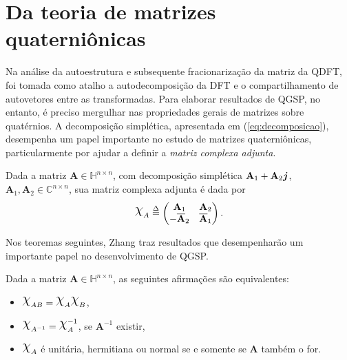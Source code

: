 
\section{Da teoria de matrizes quaterni\^onicas}

Na an\'alise da autoestrutura e subsequente fracionariza\c c\~ao da matriz da QDFT, foi tomada como atalho a autodecomposi\c c\~ao da DFT e o compartilhamento de autovetores entre as transformadas. Para elaborar resultados de QGSP, no entanto, \'e preciso mergulhar nas propriedades gerais de matrizes sobre quat\'ernios. A decomposi\c c\~ao simpl\'etica, apresentada em (\ref{eq:decomposicao}), desempenha um papel importante no estudo de matrizes quaterni\^onicas, particularmente por ajudar a definir a \emph{matriz complexa adjunta}.

\begin{definition}
Dada a matriz $ \mathbf{A} \in \mathbb{H}^{n \times n} $, com decomposi\c c\~ao simpl\'etica $ \mathbf{A}_1 + \mathbf{A}_2 \boldsymbol{j}$, $ \mathbf{A}_1,\mathbf{A}_2 \in \mathbb{C}^{n \times n} $, sua matriz complexa adjunta \'e dada por
\begin{equation}
\rchi_{A} \overset{\Delta}{=}
\begin{pmatrix}
\mathbf{A}_1 & \mathbf{A}_2\\ 
- \overline{\mathbf{A}}_2 & \overline{\mathbf{A}}_1
\end{pmatrix}.
\end{equation}
\end{definition}

Nos teoremas seguintes, Zhang traz resultados que desempenhar\~ao um importante papel no desenvolvimento de QGSP.

\begin{theorem}
\label{th:equiv01}
Dada a matriz $ \mathbf{A} \in \mathbb{H}^{n \times n} $, as seguintes afirma\c c\~oes s\~ao equivalentes:

\begin{itemize}[noitemsep]
\item $ \rchi_{AB} = \rchi_{A} \rchi_{B} $,
\item $ \rchi_{A^{-1}} = \rchi_{A}^{-1}$, se $ \mathbf{A}^{-1} $ existir,
\item $ \rchi_{A}$ \'e unit\'aria, hermitiana ou normal se e somente se $ \mathbf{A} $ tamb\'em o for.
\end{itemize}

\end{theorem}

